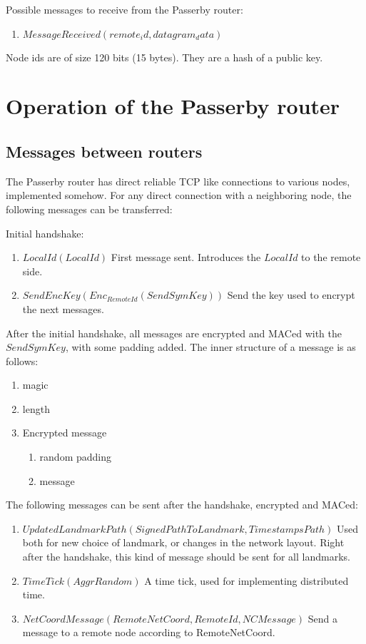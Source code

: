 \documentclass{amsart}
\theoremstyle{definition}
\theoremstyle{remark}
\numberwithin{equation}{section}
\begin{document}
Possible messages to receive from the Passerby router:
\begin{enumerate}
  \item $MessageReceived (remote_id, datagram_data)$
\end{enumerate}

Node ids are of size 120 bits (15 bytes). They are a hash of a public key.

\section{Operation of the Passerby router}

\subsection{Messages between routers}

The Passerby router has direct reliable TCP like connections to various nodes,
implemented somehow. For any direct connection with a neighboring node, the
following messages can be transferred:

Initial handshake:
\begin{enumerate}
  \item $LocalId(LocalId)$
      First message sent. Introduces the $LocalId$ to the remote side.
  \item $SendEncKey(Enc_{RemoteId}(SendSymKey))$
      Send the key used to encrypt the next messages.
\end{enumerate}

After the initial handshake, all messages are encrypted and MACed with the
$SendSymKey$, with some padding added. The inner structure of a message is as
follows:

\begin{enumerate}
  \item magic
  \item length
  \item Encrypted message
    \begin{enumerate}
      \item random padding
      \item message
    \end{enumerate}
\end{enumerate}

The following messages can be sent after the handshake, encrypted and MACed:

\begin{enumerate}
  \item $UpdatedLandmarkPath(SignedPathToLandmark, TimestampsPath)$
      Used both for new choice of landmark, or changes in the network layout.
      Right after the handshake, this kind of message should be sent for all
      landmarks.
  \item $TimeTick(AggrRandom)$
      A time tick, used for implementing distributed time.
  \item $NetCoordMessage(RemoteNetCoord, RemoteId, NCMessage)$
    Send a message to a remote node according to RemoteNetCoord.
\end{enumerate}
\end{document}
